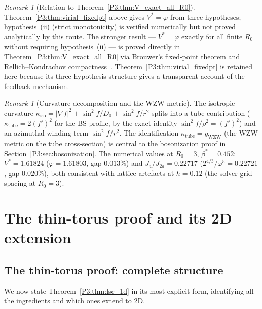 \documentclass[11pt,a4paper]{article}
\theoremstyle{definition}
\theoremstyle{remark}
\newtheorem{remark}[theorem]{Remark}
\newcommand{\vp}{\varphi}
\newcommand{\bst}{\beta^{*}}
\begin{document}
\begin{remark}[Relation to Theorem~\ref{P3:thm:V_exact_all_R0}]
\label{P3:rem:relation_to_V_exact}
Theorem~\ref{P3:thm:virial_fixedpt} above gives $V^*=\vp$ from three
hypotheses; hypothesis~(ii) (strict monotonicity) is verified numerically
but not proved analytically by this route.
The stronger result --- $V^*=\vp$ exactly for all finite $R_0$ without
requiring hypothesis~(ii) --- is proved directly in
Theorem~\ref{P3:thm:V_exact_all_R0} via Brouwer's fixed-point theorem and
Rellich--Kondrachov compactness~\cite{Evans2010}.
Theorem~\ref{P3:thm:virial_fixedpt} is retained here because its three-hypothesis
structure gives a transparent account of the feedback mechanism.
\end{remark}



\begin{remark}[Curvature decomposition and the WZW metric]
\label{P3:rem:kappa_wzw_preview}
The isotropic curvature $\kappa_{\mathrm{iso}} = |\nabla f|^2 + \sin^2\!f/D_0
+ \sin^2\!f/r^2$ splits into a tube contribution ($\kappa_{\mathrm{tube}} = 2(f')^2$
for the BS profile, by the exact identity $\sin^2\!f/\rho^2=(f')^2$) and an
azimuthal winding term $\sin^2\!f/r^2$.  The identification $\kappa_{\mathrm{tube}}
= g_{\mathrm{WZW}}$ (the WZW metric on the tube cross-section) is central to
the bosonization proof in Section~\ref{P3:sec:bosonization}.
The numerical values at $R_0=3$, $\bst=0.452$:
$V^* = 1.61824$ ($\vp = 1.61803$, gap $0.013\%$) and
$J_4/J_{2a} = 0.22717$ ($2^{4/3}/\vp^5 = 0.22721$, gap $0.020\%$),
both consistent with lattice artefacts at $h=0.12$
(the solver grid spacing at $R_0=3$).
\end{remark}

\section{The thin-torus proof and its 2D extension}
\label{P3:sec:2d_extension}

\subsection{The thin-torus proof: complete structure}

We now state Theorem~\ref{P3:thm:lsc_1d} in its most explicit form,
identifying all the ingredients and which ones extend to 2D.
\end{document}
